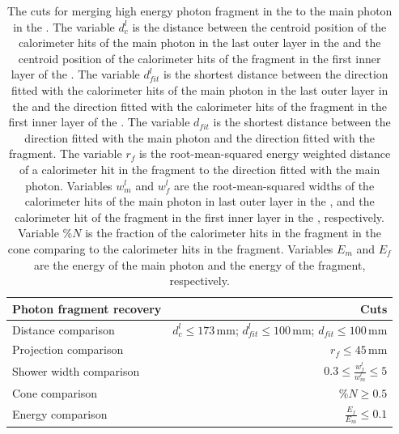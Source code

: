 \begin{table}[htbp]
\centering

\smallskip

\begin{tabular}{l r }
\hline
\hline
Photon fragment recovery&  Cuts\\
\hline
\multicolumn{1}{L{0.3\textwidth}}{Distance comparison} & \multicolumn{1}{R{0.6\textwidth}}{$d^l_c \leqslant 173\,\text{mm}$; $d^l_{fit} \leqslant 100\,\text{mm}$; $d_{fit} \leqslant 100\,\text{mm}$} \\
\multicolumn{1}{L{0.3\textwidth}}{Projection comparison} & \multicolumn{1}{R{0.6\textwidth}}{$ r_f \leqslant 45\,\text{mm}$} \\
\multicolumn{1}{L{0.3\textwidth}}{Shower width comparison} & \multicolumn{1}{R{0.6\textwidth}}{$  0.3 \leqslant \frac{w^l_f}{w^l_m} \leqslant 5$} \\
\multicolumn{1}{L{0.3\textwidth}}{Cone comparison} & \multicolumn{1}{R{0.6\textwidth}}{$ \%{N} \geqslant 0.5$} \\
\multicolumn{1}{L{0.3\textwidth}}{Energy comparison} & \multicolumn{1}{R{0.6\textwidth}}{$ \frac{E_f}{E_m} \leqslant 0.1$} \\
\hline
\hline
\end{tabular}

\caption[Cuts for merging high energy photon fragment in the \HCAL.]%
{The cuts for merging high energy photon fragment in the \HCAL to the main photon in the \ECAL. The variable $d^l_c$ is the distance between the centroid position of the calorimeter hits of the main photon in the last outer layer in the \ECAL and the centroid position of the calorimeter hits of the fragment in the first inner layer of the \HCAL. The variable $d^l_{fit}$ is the shortest distance between the direction fitted with the calorimeter hits of the main photon in the  last outer layer in the \ECAL and the direction fitted with  the calorimeter hits of the fragment in the first inner layer of the \HCAL. The variable $d_{fit}$ is the shortest distance between the direction fitted with the main photon and the direction fitted with the fragment. The variable  $r_f$ is the root-mean-squared energy weighted distance of a calorimeter hit in the fragment to the direction fitted with the main photon. Variables $w^l_m$ and $w^l_f$ are the root-mean-squared widths of the calorimeter hits of the main photon in last outer layer  in the \ECAL, and the calorimeter hit of the fragment in the first inner layer  in the \HCAL, respectively. Variable $\%{N}$ is the fraction of the calorimeter hits in the fragment in the cone comparing to the  calorimeter hits in the fragment.  Variables $E_m$ and $E_f$ are the energy of the main photon  and the energy of the fragment, respectively.}
\label{tab:photonHighEnergyFragCuts}
\end{table}


